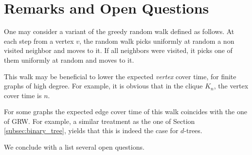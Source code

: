 \documentclass[12pt,a4paper]{article}
\newcommand{\0}{{\bf 0}}
\begin{document}
    \begin{figure}[htbp]
    \end{figure}


\section{Remarks and Open Questions}\label{sec:remarks}

    One may consider a variant of the greedy random walk defined as follows.
    At each step from a vertex $v$, the random walk picks uniformly at random a non visited neighbor
    and moves to it. If all neighbors were visited, it picks one of them uniformly at random and moves to it.

    This walk may be beneficial to lower the expected \emph{vertex} cover time, for finite graphs of high degree.
    For example, it is obvious that in the clique $K_n$, the vertex cover time is $n$.

    For some graphs the expected edge cover time of this walk coincides with the one of GRW.
    For example, a similar treatment as the one of Section \ref{subsec:binary_tree}, yields that this is indeed the case for $d$-trees.

    \bigskip

    We conclude with a list several open questions.
\end{document}
